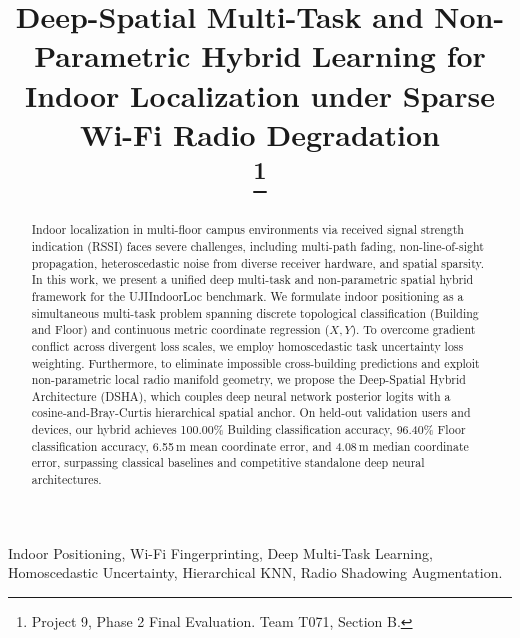 \documentclass[conference]{IEEEtran}
\begin{document}
\title{Deep-Spatial Multi-Task and Non-Parametric Hybrid Learning for Indoor Localization under Sparse Wi-Fi Radio Degradation\\
\thanks{Project 9, Phase 2 Final Evaluation. Team T071, Section B.}
}

\author{
}

\maketitle

\begin{abstract}
Indoor localization in multi-floor campus environments via received signal strength indication (RSSI) faces severe challenges, including multi-path fading, non-line-of-sight propagation, heteroscedastic noise from diverse receiver hardware, and spatial sparsity. In this work, we present a unified deep multi-task and non-parametric spatial hybrid framework for the UJIIndoorLoc benchmark. We formulate indoor positioning as a simultaneous multi-task problem spanning discrete topological classification (Building and Floor) and continuous metric coordinate regression ($X, Y$). To overcome gradient conflict across divergent loss scales, we employ homoscedastic task uncertainty loss weighting. Furthermore, to eliminate impossible cross-building predictions and exploit non-parametric local radio manifold geometry, we propose the Deep-Spatial Hybrid Architecture (DSHA), which couples deep neural network posterior logits with a cosine-and-Bray-Curtis hierarchical spatial anchor. On held-out validation users and devices, our hybrid achieves 100.00\% Building classification accuracy, 96.40\% Floor classification accuracy, 6.55\,m mean coordinate error, and 4.08\,m median coordinate error, surpassing classical baselines and competitive standalone deep neural architectures.
\end{abstract}

\begin{IEEEkeywords}
Indoor Positioning, Wi-Fi Fingerprinting, Deep Multi-Task Learning, Homoscedastic Uncertainty, Hierarchical KNN, Radio Shadowing Augmentation.
\end{IEEEkeywords}
\end{document}
